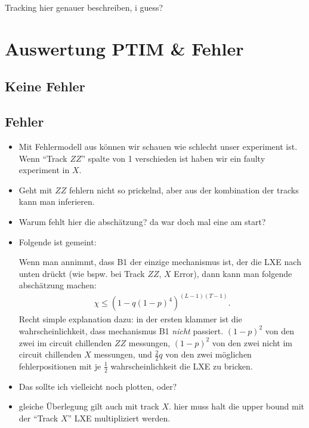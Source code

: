 Tracking hier genauer beschreiben, i guess?

\section{Auswertung PTIM \& Fehler}
\subsection{Keine Fehler}
\subsection{Fehler}
\begin{itemize}
  \item Mit Fehlermodell aus \cite{tikhanovskayaUniversalityCrossEntropy2023}
    k\"onnen wir schauen wie schlecht unser experiment ist. Wenn
    \enquote{Track $ZZ$} spalte von 1 verschieden ist haben wir ein faulty
    experiment in $X$.
  \item Geht mit $ZZ$ fehlern nicht so prickelnd,%
    aber aus der kombination der tracks kann man inferieren. 
  \item Warum fehlt hier die absch\"atzung? da war doch mal eine am start?
  \item Folgende ist gemeint:

    Wenn man annimmt, dass \textsf{B1} der einzige mechanismus ist, der die LXE
    nach unten dr\"uckt (wie bspw. bei Track $ZZ$, $X$ Error), dann kann man
    folgende absch\"atzung machen:
    \begin{align}
      \chi \leq \left( 1-q\left( 1-p \right)^4  \right)^{(L-1)(T-1)}
    .\end{align}
    Recht simple explanation dazu: in der ersten klammer ist die
    wahrscheinlichkeit, dass mechanismus \textsf{B1} \emph{nicht} passiert.
    $\left( 1-p \right)^2$ von den zwei im circuit chillenden $ZZ$ messungen,
    $\left( 1-p \right)^2$ von den zwei nicht im circuit chillenden $X$
    messungen, und $\frac{2}{2} q$ von den zwei m\"oglichen fehlerpositionen
    mit je $\frac{1}{2}$ wahrscheinlichkeit die LXE zu bricken.

  \item Das sollte ich vielleicht noch plotten, oder?
  \item gleiche \"Uberlegung gilt auch mit track $X$. hier muss halt die upper
    bound mit der \enquote{Track $X$} LXE multipliziert werden.
\end{itemize}

